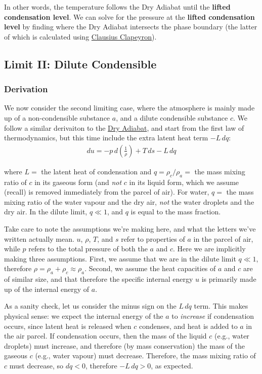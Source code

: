 In other words, the temperature follows the Dry Adiabat until the \textbf{lifted condensation level}. We can solve for the pressure at the \textbf{lifted condensation level} by finding where the Dry Adiabat intersects the phase boundary (the latter of which is calculated using \hyperref[Clausius Clapeyron]{Clausius Clapeyron}).

\subsection{Limit II: Dilute Condensible}

\subsubsection{Derivation}

We now consider the second limiting case, where the atmosphere is mainly made up of a non-condensible substance $a$, and a dilute condensible substance $c$. We follow a similar derivaiton to the \hyperref[Dry Adiabat]{Dry Adiabat}, and start from the first law of thermodynamics, but this time include the extra latent heat term $-L\,dq$:
\begin{align}\label{1st law latent heat}
    du=-p\,d\left(\frac{1}{\rho}\right)+T\,ds-L\,dq
\end{align}

\noindent where $L=$ the latent heat of condensation and $q=\rho_c/\rho_a=$ the mass mixing ratio of $c$ in its gaseous form (and \textit{not} $c$ in its liquid form, which we assume (recall) is removed immediately from the parcel of air). For water, $q=$ the mass mixing ratio of the water vapour and the dry air, \textit{not} the water droplets and the dry air. In the dilute limit, $q\ll 1$, and $q$ is equal to the mass fraction. 

Take care to note the assumptions we're making here, and what the letters we've written actually mean. $u$, $\rho$, $T$,  and $s$ refer to properties of $a$ in the parcel of air, while $p$ refers to the total pressure of both the $a$ and $c$. Here we are implicitly making three assumptions. First, we assume that we are in the dilute limit $q\ll 1$, therefore $\rho=\rho_a+\rho_c\approx\rho_a$. Second, we assume the heat capacities of $a$ and $c$ are of similar size, and that therefore the specific internal energy $u$ is primarily made up of the internal energy of $a$.

As a sanity check, let us consider the minus sign on the $L\,dq$ term. This makes physical sense: we expect the internal energy of the $a$ to \textit{increase} if condensation occurs, since latent heat is released when $c$ condenses, and heat is added to $a$ in the air parcel. If condensation occurs, then the mass of the liquid $c$ (e.g., water droplets) must increase, and therefore (by mass conservation) the mass of the gaseous $c$ (e.g., water vapour) must decrease. Therefore, the mass mixing ratio of $c$ must decrease, so $dq<0$, therefore $-L\,dq>0$, as expected.

